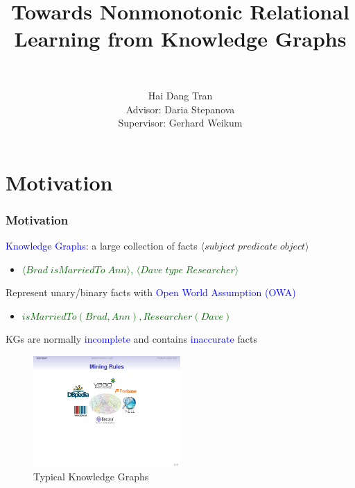 \documentclass{beamer}
\title{Towards Nonmonotonic Relational Learning from Knowledge Graphs}
\author[Stepanova]
 {
   \large{}\\
 }
\author[shortname]{Hai Dang Tran\\Advisor: Daria Stepanova\\Supervisor: Gerhard Weikum}
\institute[shortinst]{Max Planck Institute for Informatics\\
                      Saarland University, Saarbr\"{u}cken, Germany}
\date[]{}
\newcommand{\tuple}[1]{\ensuremath{\langle#1\rangle}}
\newcommand{\bl}[1]{\textcolor{blue}{#1}}
\newcommand{\gr}[1]{\textcolor{darkgreen}{#1}}
\newcommand{\mi}[1]{\ensuremath{\mathit{#1}}}
\begin{document}
\frame{\titlepage}
\addtocounter{framenumber}{-1}


\section{Motivation}
\begin{frame}\frametitle{Motivation}
\medskip
\begin{itemize}
\small{\item \textcolor{blue}{Knowledge Graphs}: a large collection of facts $\tuple{subject\;predicate\;object}$
\begin{itemize}
\item[] \gr{$\tuple{\mi{Brad\;isMarriedTo\;Ann}}$, $\tuple{\mi{Dave \;type\;Researcher}}$}
\end{itemize}
\bigskip

\item Represent unary/binary facts with \textcolor{blue}{Open World Assumption (OWA)}
\begin{itemize}
\item[] \gr{$\mi{isMarriedTo(Brad,Ann), Researcher(Dave)}$}
\end{itemize}
\bigskip

\item KGs are normally \bl{incomplete} and contains \bl{inaccurate} facts


}
\end{itemize}

\begin{figure}[ht]
\includegraphics[width=0.5\textwidth]{kb}
\caption{Typical Knowledge Graphs}
\end{figure}

\end{frame}
\end{document}
